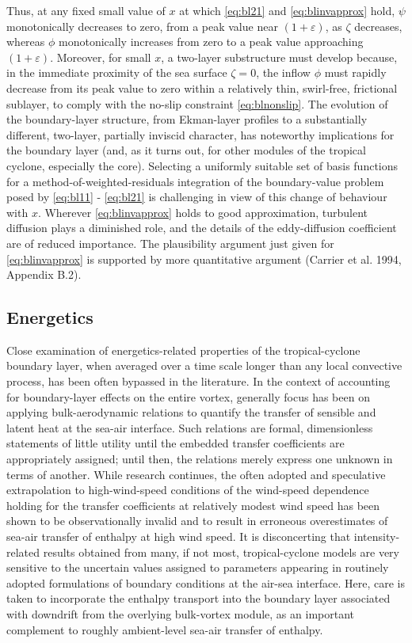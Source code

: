 \documentclass[preprint, prX]{revtex4}
\begin{document}
Thus, at any fixed small value of $x$ at which \eqref{eq:bl21} and \eqref{eq:blinvapprox} hold, $\psi$ monotonically decreases to zero, from a peak value near $(1 + \varepsilon)$, as $\zeta$ decreases, whereas $\phi$ monotonically increases from zero to a peak value approaching $(1 + \varepsilon)$. Moreover, for small $x$, a two-layer substructure must develop because, in the immediate proximity of the sea surface $\zeta = 0$, the inflow $\phi$ must rapidly decrease from its peak value to zero within a relatively thin, swirl-free, frictional sublayer, to comply with the no-slip constraint \eqref{eq:blnonslip}. The evolution of the boundary-layer structure, from Ekman-layer profiles to a substantially different, two-layer, partially inviscid character, has noteworthy implications for the boundary layer (and, as it turns out, for other modules of the tropical cyclone, especially the core). Selecting a uniformly suitable set of basis functions for a method-of-weighted-residuals integration of the boundary-value problem posed by \eqref{eq:bl11} - \eqref{eq:bl21} is challenging in view of this change of behaviour with $x$. Wherever \eqref{eq:blinvapprox} holds to good approximation, turbulent diffusion plays a diminished role, and the details of the eddy-diffusion coefficient are of reduced importance. The plausibility argument just given for \eqref{eq:blinvapprox} is supported by more quantitative argument (Carrier et al. 1994, Appendix B.2).

\subsection{Energetics}

Close examination of energetics-related properties of the tropical-cyclone boundary layer, when averaged over a time scale longer than any local convective process, has been often bypassed in the literature. In the context of accounting for boundary-layer effects on the entire vortex, generally focus has been on applying bulk-aerodynamic relations to quantify the transfer of sensible and latent heat at the sea-air interface. Such relations are formal, dimensionless statements of little utility until the embedded transfer coefficients are appropriately assigned; until then, the relations merely express one unknown in terms of another. While research continues, the often adopted and speculative extrapolation to high-wind-speed conditions of the wind-speed dependence holding for the transfer coefficients at relatively modest wind speed has been shown to be observationally invalid and to result in erroneous overestimates of sea-air transfer of enthalpy at high wind speed. It is disconcerting that intensity-related results obtained from many, if not most, tropical-cyclone models are very sensitive to the uncertain values assigned to parameters appearing in routinely adopted formulations of boundary conditions at the air-sea interface. Here, care is taken to incorporate the enthalpy transport into the boundary layer associated with downdrift from the overlying bulk-vortex module, as an important complement to roughly ambient-level sea-air transfer of enthalpy.
\end{document}
